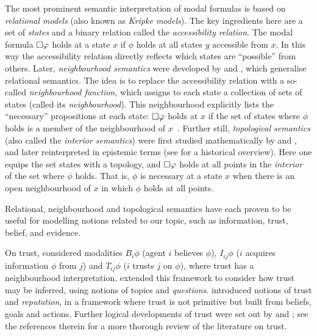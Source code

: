 {The most prominent semantic interpretation of modal formulas is based on
\emph{relational models} (also known as \emph{Kripke models}). The key
ingredients here are a set of \emph{states} and a binary relation called the
\emph{accessibility relation}. The modal formula $\Box\varphi$ holds at a
state $x$ if $\phi$ holds at all states $y$ accessible from $x$.\footnotemark{}
In this way the accessibility relation directly reflects which states are
``possible'' from others.
%
Later, \emph{neighbourhood semantics} were developed by \textcite{Scott1970}
and \textcite{montague1970universal}, which generalise relational semantics.
The idea is to replace the accessibility relation with a so-called
\emph{neighbourhood function}, which assigns to each state a collection of sets
of states (called its \emph{neighbourhood}). This neighbourhood explicitly
lists the ``necessary'' propositions at each state: $\Box\varphi$ holds at
$x$ if the set of states where $\phi$ holds is a member of the neighbourhood of
$x$~\cite{pacuit2017neighborhood}.
%
Further still, \emph{topological semantics} (also called the \emph{interior
semantics}) were first studied mathematically by \textcite{mckinsey41} and
\textcite{mckinseytarski44}, and later reinterpreted in epistemic terms (see
\textcite[Chapter 1]{ozgun_evidence} for a historical overview). Here one
equips the set states with a topology, and $\Box\varphi$ holds at all points
in the \emph{interior} of the set where $\phi$ holds. That is, $\phi$ is
necessary at a state $x$ when there is an open neighbourhood of $x$ in which
$\phi$ holds at all points.


Relational, neighbourhood and topological semantics have each proven to be
useful for modelling notions related to our topic, such as information, trust,
belief, and evidence.

On trust, \textcite{Liau_2003} considered modalities $B_i\phi$ (agent $i$
believes $\phi$), $I_{ij}\phi$ ($i$ acquires information $\phi$ from $j$) and
$T_{ij}\phi$ ($i$ trusts $j$ on $\phi$), where trust has a neighbourhood
interpretation. \textcite{dastani2004inferring} extended this framework to
consider how trust may be inferred, using notions of topics and
\emph{questions}. \textcite{herzig2010logic} introduced notions of trust and
\emph{reputation}, in a framework where trust is not primitive but built from
beliefs, goals and actions. Further logical developments of trust were set out
by \textcite{rodenhauser2014matter} and \textcite{tagliaferri2019logical}; see
the references therein for a more thorough review of the literature on trust.

}
